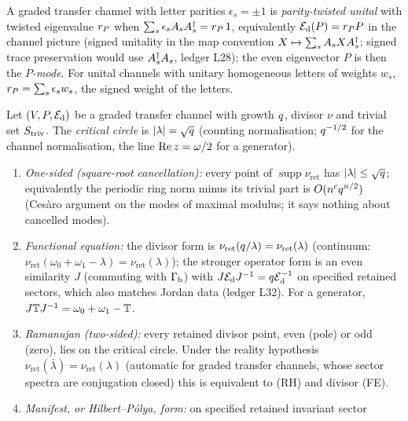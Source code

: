 \begin{definition}
\label{def:parity-twisted-tp}
A graded transfer channel with letter parities $\epsilon_s = \pm1$ is \emph{parity-twisted unital} with
twisted eigenvalue $r_{P}$ when $\sum_s\epsilon_sA_{s}A_{s}^\dagger = r_{P}\,1$,
equivalently $\mathcal E_{\mathrm d}(P) = r_{P} P$ in the channel picture (signed unitality in the map convention
$X\mapsto\sum_sA_{s}XA_{s}^\dagger$; signed trace preservation would use
$A_{s}^\dagger A_{s}$, ledger L28); the even eigenvector $P$
is then the \emph{$P$-mode}. For unital channels with unitary homogeneous letters of weights $w_s$,
$r_{P} = \sum_s\epsilon_sw_s$, the signed weight of the letters.
\end{definition}

\begin{definition}
\label{def:graded-rh-fe-ramanujan}
Let $(V,P,\mathcal E_{\mathrm d})$ be a graded transfer channel with growth $q$, divisor $\nu$ and trivial set
$S_{\mathrm{triv}}$. The \emph{critical circle} is $|\lambda| = \sqrt{q}$ (counting normalisation; $q^{-1/2}$
for the channel normalisation, the line $\operatorname{Re} z = \omega/2$ for a generator).
\begin{enumerate}
\item[(RH)] \emph{One-sided (square-root cancellation):} every point of
$\operatorname{supp}\nu_{\mathrm{ret}}$ has $|\lambda|\le\sqrt{q}$; equivalently the periodic
ring norm minus its trivial part is $O(n^cq^{n/2})$ (Ces\`aro argument on the modes of maximal
modulus; it says nothing about cancelled modes).
\item[(FE)] \emph{Functional equation:} the divisor form is $\nu_{\mathrm{ret}}(q/\lambda) =
\nu_{\mathrm{ret}}(\lambda)$ (continuum: $\nu_{\mathrm{ret}}(\omega_0+\omega_1-\lambda) =
\nu_{\mathrm{ret}}(\lambda)$); the stronger operator form is an even similarity $J$ (commuting with
$\Gamma_{\mathrm b}$) with $J\mathcal E_{\mathrm d} J^{-1} = q\mathcal E_{\mathrm d}^{-1}$ on specified retained sectors, which also matches Jordan
data (ledger L32). For a generator, $J\mathbb T J^{-1} = \omega_0+\omega_1-\mathbb T$.
\item[(Ram)] \emph{Ramanujan (two-sided):} every retained divisor point, even (pole) or odd
(zero), lies on the critical circle. Under the reality hypothesis $\nu_{\mathrm{ret}}(\bar\lambda)
= \nu_{\mathrm{ret}}(\lambda)$ (automatic for graded transfer channels, whose sector spectra are
conjugation closed) this is equivalent to (RH) and divisor (FE).
\item[(HP)] \emph{Manifest, or Hilbert--P\'olya, form:} on specified retained invariant sector

\end{enumerate}
\end{definition}
